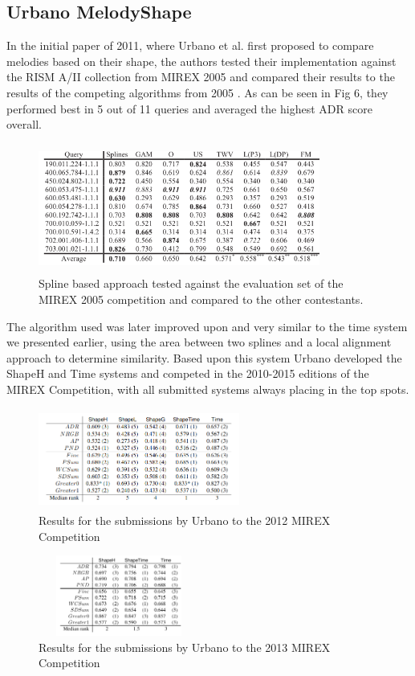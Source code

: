 \documentclass{llncs}
\begin{document}
\subsection{Urbano MelodyShape}
            In the initial paper of 2011, where Urbano et al. first proposed to compare melodies based on their shape, the authors tested their implementation against the RISM A/II collection from MIREX 2005 and compared their results to the results of the competing algorithms from 2005 \cite{five_point_five}. As can be seen in Fig 6, they performed best in 5 out of 11 queries and averaged the highest ADR score overall. 
        \begin{figure}[h!]
			\centering
            \includegraphics[width=350px,height=160px,keepaspectratio]{one_of_five_point_five}
			\caption{Spline based approach tested against the evaluation set of the MIREX 2005 competition and compared to the other contestants. \cite{five_point_five}}
        \end{figure}
            The algorithm used was later improved upon and very similar to the time system we presented earlier, using the area between two splines and a local alignment approach to determine similarity. Based upon this system Urbano developed the ShapeH and Time systems  and competed in the 2010-2015 editions of the MIREX Competition, with all submitted systems always placing in the top spots. 
        \begin{figure}[h!]
			\centering
            \includegraphics[width=250px,height=125px,keepaspectratio]{urbano_mirex_2012_results}
			\caption{Results for the submissions by Urbano to the 2012 MIREX Competition \cite{five_point_four}}
        \end{figure}
        \begin{figure}[h!]
			\centering
            \includegraphics[width=200px,height=100px,keepaspectratio]{urbano_mirex_2013_results}
			\caption{Results for the submissions by Urbano to the 2013 MIREX Competition \cite{five_point_three}}
        \end{figure}
\end{document}
